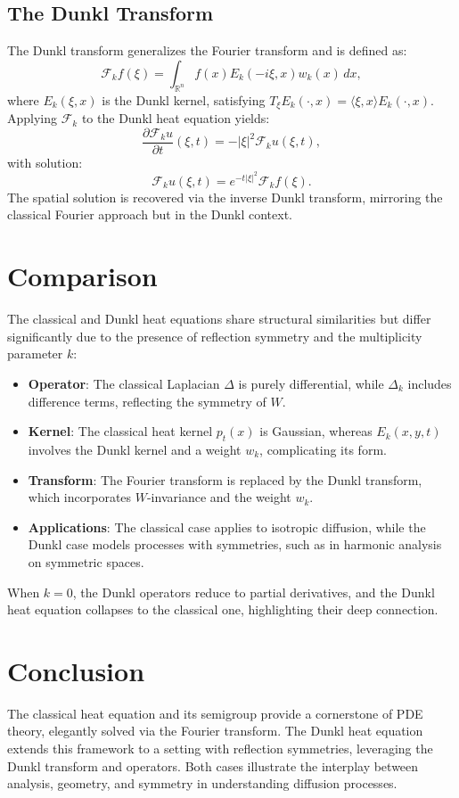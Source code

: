 \documentclass[a4paper,12pt]{article}
\begin{document}
\subsection{The Dunkl Transform}
The Dunkl transform generalizes the Fourier transform and is defined as:
\begin{equation}
\mathcal{F}_k f(\xi) = \int_{\mathbb{R}^n} f(x) E_k(-i \xi, x) w_k(x) \, dx,
\end{equation}
where $E_k(\xi, x)$ is the Dunkl kernel, satisfying $T_\xi E_k(\cdot, x) = \langle \xi, x \rangle E_k(\cdot, x)$. Applying $\mathcal{F}_k$ to the Dunkl heat equation yields:
\begin{equation}
\frac{\partial \mathcal{F}_k u}{\partial t}(\xi,t) = -|\xi|^2 \mathcal{F}_k u(\xi,t),
\end{equation}
with solution:
\begin{equation}
\mathcal{F}_k u(\xi,t) = e^{-t |\xi|^2} \mathcal{F}_k f(\xi).
\end{equation}
The spatial solution is recovered via the inverse Dunkl transform, mirroring the classical Fourier approach but in the Dunkl context.

\section{Comparison}
The classical and Dunkl heat equations share structural similarities but differ significantly due to the presence of reflection symmetry and the multiplicity parameter $k$:
\begin{itemize}
    \item \textbf{Operator}: The classical Laplacian $\Delta$ is purely differential, while $\Delta_k$ includes difference terms, reflecting the symmetry of $W$.
    \item \textbf{Kernel}: The classical heat kernel $p_t(x)$ is Gaussian, whereas $E_k(x,y,t)$ involves the Dunkl kernel and a weight $w_k$, complicating its form.
    \item \textbf{Transform}: The Fourier transform is replaced by the Dunkl transform, which incorporates $W$-invariance and the weight $w_k$.
    \item \textbf{Applications}: The classical case applies to isotropic diffusion, while the Dunkl case models processes with symmetries, such as in harmonic analysis on symmetric spaces.
\end{itemize}
When $k = 0$, the Dunkl operators reduce to partial derivatives, and the Dunkl heat equation collapses to the classical one, highlighting their deep connection.

\section{Conclusion}
The classical heat equation and its semigroup provide a cornerstone of PDE theory, elegantly solved via the Fourier transform. The Dunkl heat equation extends this framework to a setting with reflection symmetries, leveraging the Dunkl transform and operators. Both cases illustrate the interplay between analysis, geometry, and symmetry in understanding diffusion processes.
\end{document}
